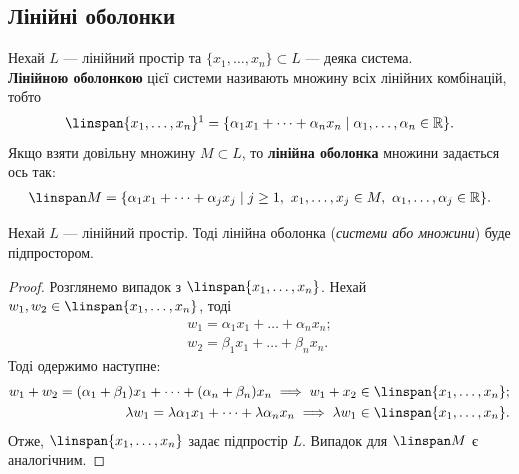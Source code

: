 \documentclass{math_library}
\begin{document}
	\subsection{Лінійні оболонки}
	\begin{definition}
	Нехай $L$ --- лінійний простір та $\{x_1, \dots, x_n\} \subset L$ --- деяка система.\\
	\textbf{Лінійною оболонкою} цієї системи називають множину всіх лінійних комбінацій, тобто
	\begin{align*}
	\linspan\{x_1, \dots, x_n\}\footnotemark = \{\alpha_1 x_1 + \dots + \alpha_n x_n \mid \alpha_1, \dots, \alpha_n \in \mathbb{R}\}.
	\end{align*}
	Якщо взяти довільну множину $M \subset L$, то \textbf{лінійна оболонка} множини задається ось так:
	\begin{align*}
	\linspan M = \{\alpha_1 x_1 + \dots + \alpha_j x_j \mid j \geq 1,\ x_1,\dots,x_j \in M,\ \alpha_1, \dots, \alpha_j \in \mathbb{R}\}.
	\end{align*}
	\end{definition}
	
	\begin{proposition}
	Нехай $L$ --- лінійний простір. Тоді лінійна оболонка (\textit{системи або множини}) буде підпростором.
	\end{proposition}
	
	\begin{proof}
	Розглянемо випадок з $\linspan\{x_1, \dots, x_n\}$. Нехай $w_1,w_2 \in \linspan\{x_1, \dots, x_n\}$, тоді
	\begin{align*}
	w_1 = \alpha_1 x_1 + \dots + \alpha_n x_n; \\
	w_2 = \beta_1 x_1 + \dots + \beta_n x_n.
	\end{align*}
	Тоді одержимо наступне:
	\begin{align*}
	w_1 + w_2 = (\alpha_1 + \beta_1)x_1 + \dots + (\alpha_n + \beta_n)x_n \implies w_1 + x_2 \in \linspan\{x_1, \dots, x_n\}; \\
	\lambda w_1 = \lambda \alpha_1 x_1 + \dots + \lambda \alpha_n x_n \implies \lambda w_1 \in \linspan\{x_1, \dots, x_n\}.
	\end{align*}
	Отже, $\linspan\{x_1, \dots, x_n\}$ задає підпростір $L$. Випадок для $\linspan M$ є аналогічним.
	\end{proof} 
	
\end{document}

